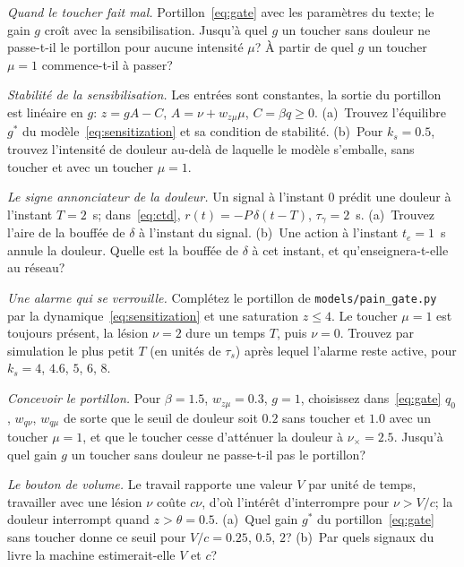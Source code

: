 \begin{exercise}[\lvlB]
\label{ex:14:2}
\emph{Quand le toucher fait mal.} Portillon~\eqref{eq:gate} avec les paramètres du texte; le gain $g$ croît avec la sensibilisation. Jusqu'à quel $g$ un toucher sans douleur ne passe-t-il le portillon pour aucune intensité $\mu$? À partir de quel $g$ un toucher $\mu=1$ commence-t-il à passer?
\end{exercise}

\begin{exercise}[\lvlB]
\label{ex:14:3}
\emph{Stabilité de la sensibilisation.} Les entrées sont constantes, la sortie du portillon est linéaire en $g$: $z=gA-C$, $A=\nu+w_{z\mu}\mu$, $C=\beta q\ge0$. (a)~Trouvez l'équilibre $g^*$ du modèle~\eqref{eq:sensitization} et sa condition de stabilité. (b)~Pour $k_s=0.5$, trouvez l'intensité de douleur au-delà de laquelle le modèle s'emballe, sans toucher et avec un toucher $\mu=1$.
\end{exercise}

\begin{exercise}[\lvlA]
\label{ex:14:4}
\emph{Le signe annonciateur de la douleur.} Un signal à l'instant $0$ prédit une douleur à l'instant $T=2$~s; dans~\eqref{eq:ctd}, $r(t)=-P\,\delta(t-T)$, $\tau_\gamma=2$~s. (a)~Trouvez l'aire de la bouffée de $\delta$ à l'instant du signal. (b)~Une action à l'instant $t_e=1$~s annule la douleur. Quelle est la bouffée de $\delta$ à cet instant, et qu'enseignera-t-elle au réseau?
\end{exercise}

\begin{exercise}[\lvlB]
\label{ex:14:5}
\emph{Une alarme qui se verrouille.} Complétez le portillon de \texttt{models/\allowbreak pain\_gate.py} par la dynamique~\eqref{eq:sensitization} et une saturation $z\le4$. Le toucher $\mu=1$ est toujours présent, la lésion $\nu=2$ dure un temps $T$, puis $\nu=0$. Trouvez par simulation le plus petit $T$ (en unités de $\tau_s$) après lequel l'alarme reste active, pour $k_s=4$, $4.6$, $5$, $6$, $8$.
\end{exercise}

\begin{exercise}[\lvlB]
\label{ex:14:6}
\emph{Concevoir le portillon.} Pour $\beta=1.5$, $w_{z\mu}=0.3$, $g=1$, choisissez dans~\eqref{eq:gate} $q_0$, $w_{q\nu}$, $w_{q\mu}$ de sorte que le seuil de douleur soit $0.2$ sans toucher et $1.0$ avec un toucher $\mu=1$, et que le toucher cesse d'atténuer la douleur à $\nu_\times=2.5$. Jusqu'à quel gain $g$ un toucher sans douleur ne passe-t-il pas le portillon?
\end{exercise}

\begin{exercise}[\lvlC]
\label{ex:14:7}
\emph{Le bouton de volume.} Le travail rapporte une valeur $V$ par unité de temps, travailler avec une lésion $\nu$ coûte $c\nu$, d'où l'intérêt d'interrompre pour $\nu>V/c$; la douleur interrompt quand $z>\theta=0.5$. (a)~Quel gain $g^*$ du portillon~\eqref{eq:gate} sans toucher donne ce seuil pour $V/c=0.25$, $0.5$, $2$? (b)~Par quels signaux du livre la machine estimerait-elle $V$ et $c$?
\end{exercise}

